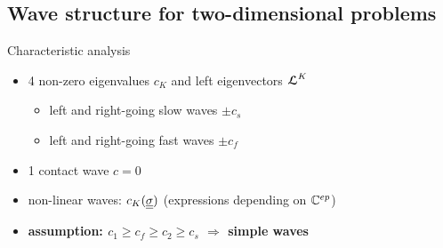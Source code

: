 
\subsection{Wave structure for two-dimensional problems}

\begin{frame}
  \begin{block}{Characteristic analysis}
    \begin{itemize}
    \item 4 non-zero eigenvalues $c_K$ and left eigenvectors ${\boldsymbol{\mathcal{L}}}^K$ 
      \begin{itemize}
      \item[] left and right-going slow waves $\pm c_s$
      \item[] left and right-going fast waves $\pm c_f$
      \end{itemize}
    \item 1 contact wave $c=0$
    \item non-linear waves: $c_K({\underline{\underline{\sigma}}})$ (expressions depending on $\mathbb{C}^{ep}$)
    \item \textbf{assumption: $c_1 \geq c_f \geq c_2 \geq c_s$ $\Rightarrow$ simple waves}
    \end{itemize}
  \end{block}
\end{frame}



